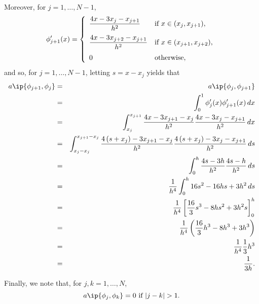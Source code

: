 \begin{solution}
\begin{enumerate}
\begin{enumerate}
Moreover, for $j=1,\ldots,N-1$,
\[
\phi_{j+1}'(x)=\left\{\begin{array}{ll}
\displaystyle{{4x-3x_j-x_{j+1} \over h^2}} & \displaystyle{\mbox{if }x\in(x_j,x_{j+1})},
\\[10pt]
\displaystyle{{4x-3x_{j+2}-x_{j+1} \over h^2}} & \displaystyle{\mbox{if }x\in(x_{j+1},x_{j+2})},
\\[10pt]
0 & \mbox{otherwise},
\end{array}\right.
\]
and so, for $j=1,\ldots,N-1$, letting $s=x-x_j$ yields that
\begin{eqnarray*}
a\ip{\phi_{j+1},\phi_j}&=&a\ip{\phi_j,\phi_{j+1}}
\\
&=&\int_0^1\phi_j'(x)\phi_{j+1}'(x)\,dx
\\
&=&\int_{x_j}^{x_{j+1}}{4x-3x_{j+1}-x_j \over h^2}{4x-3x_j-x_{j+1} \over h^2}\,dx
\\
&=&\int_{x_j-x_j}^{x_{j+1}-x_j}{4\left(s+x_j\right)-3x_{j+1}-x_j \over h^2}{4\left(s+x_j\right)-3x_j-x_{j+1} \over h^2}\,ds
\\
&=&\int_0^h{4s-3h \over h^2}{4s-h \over h^2}\,ds
\\
&=&{1 \over h^4}\int_0^h16s^2-16hs+3h^2\,ds
\\
&=&{1 \over h^4}\left[{16 \over 3}s^3-8hs^2+3h^2s\right]_0^h
\\
&=&{1 \over h^4}\left({16 \over 3}h^3-8h^3+3h^3\right)
\\
&=&{1 \over h^4}{1 \over 3}h^3
\\
&=&{1 \over 3h}.
\end{eqnarray*}

Finally, we note that, for $j,k=1,\ldots,N$,
\[
a\ip{\phi_j,\phi_k}=0\mbox{ if }|j-k|>1.
\]


\end{enumerate}
\end{enumerate}
\end{solution}
